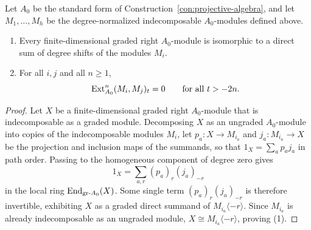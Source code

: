 \begin{lemma}
\label{lem:positive-ext-vanishing}
Let $A_0$ be the standard form of Construction~\ref{con:projective-algebra},
and let $M_1,\ldots,M_h$ be the degree-normalized indecomposable
$A_0$-modules defined above.
\begin{enumerate}[label={\upshape(\arabic*)}]
\item Every finite-dimensional graded right $A_0$-module is isomorphic to a
direct sum of degree shifts of the modules $M_i$.
\item For all $i,j$ and all $n\geq1$,
\[
                 \operatorname{Ext}^n_{A_0}(M_i,M_j)_t=0\qquad\text{for all }t>-2n.
\]
\end{enumerate}
\end{lemma}
\begin{proof}
Let $X$ be a finite-dimensional graded right $A_0$-module that is
indecomposable as a graded module. Decomposing $X$ as an ungraded
$A_0$-module into copies of the indecomposable modules $M_i$, let
$p_a:X\to M_{i_a}$ and $j_a:M_{i_a}\to X$ be the projection and inclusion
maps of the summands, so that $1_X=\sum_a p_a j_a$ in path order. Passing to
the homogeneous component of degree zero gives
\[
                   1_X=\sum_{a,r}(p_a)_r(j_a)_{-r}
\]
in the local ring $\operatorname{End}_{\mathrm{gr}\text{-}A_0}(X)$. Some single term
$(p_a)_r(j_a)_{-r}$ is therefore invertible, exhibiting $X$ as a graded
direct summand of $M_{i_a}\langle-r\rangle$. Since $M_{i_a}$ is already
indecomposable as an ungraded module, $X\cong M_{i_a}\langle-r\rangle$,
proving (1).


\end{proof}
